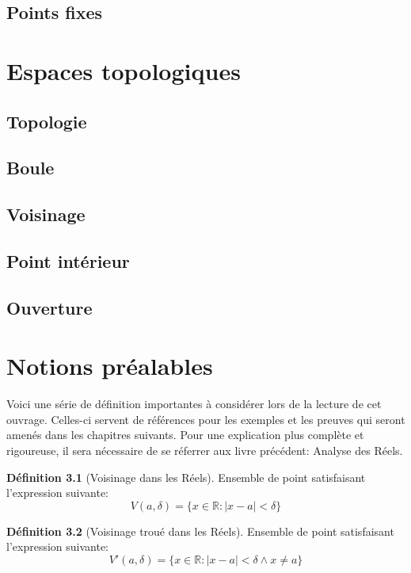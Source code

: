 \documentclass[12pt]{book}
\let\Bbb\mathbb
\theoremstyle{definition}
\newtheorem{definition}{Définition}[section]
\begin{document}
\section{Points fixes}


\chapter{Espaces topologiques}
\section{Topologie}
\section{Boule}
\section{Voisinage}
\section{Point intérieur}
\section{Ouverture}


\appendix
\chapter{Notions préalables}
Voici une série de définition importantes à considérer lors de la lecture de cet ouvrage. Celles-ci servent
de références pour les exemples et les preuves qui seront amenés dans les chapitres suivants. Pour une explication
plus complète et rigoureuse, il sera nécessaire de se réferrer aux livre précédent: Analyse des Réels.

\begin{definition}[Voisinage dans les Réels]
    \label{def:voisinage_reels}
    Ensemble de point satisfaisant l'expression
    suivante: $$V(a, \delta) = \{ x \in \Bbb R : |x - a| < \delta \}$$
\end{definition}

\begin{definition}[Voisinage troué dans les Réels]
    \label{def:voisinage_troue_reels}
    Ensemble de point satisfaisant l'expression
    suivante: $$V'(a, \delta) = \{ x \in \Bbb R : |x - a| < \delta \land x \neq a \}$$
\end{definition}
\end{document}
